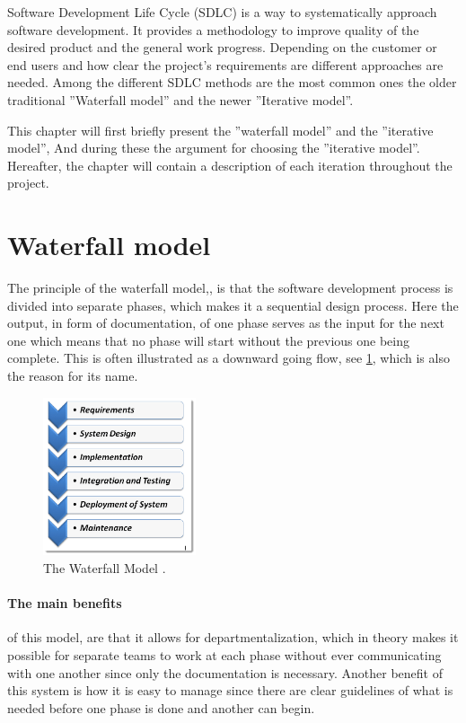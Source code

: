 Software Development Life Cycle (SDLC) is a way to systematically approach software development.
It provides a methodology to improve quality of the desired product and the general work progress. 
Depending on the customer or end users and how clear the project's requirements are different approaches are needed. 
Among the different SDLC methods are the most common ones the older traditional ''Waterfall model'' and the newer ''Iterative model''. \cite{SDLC-Toolsqa}

This chapter will first briefly present the ''waterfall model'' and the ''iterative model'', And during these the argument for choosing the ''iterative model''.
Hereafter, the chapter will contain a description of each iteration throughout the project.


\section{Waterfall model}\label{sec:WaterfallModel}
The principle of the waterfall model,\cite{Waterfall-Toolsqa}, is that the software development process is divided into separate phases, which makes it a sequential design process.
Here the output, in form of documentation, of one phase serves as the input for the next one which means that no phase will start without the previous one being complete.
This is often illustrated as a downward going flow, see \cref{fig:Waterfall}, which is also the reason for its name.

\begin{figure}[H]
	\centering
	\includegraphics[width=0.4\textwidth]{billeder/WaterFall-Model.png}
	\caption{The Waterfall Model \cite{Waterfall-Toolsqa}.}\label{fig:Waterfall}
\end{figure}

\paragraph{The main benefits} of this model, are that it allows for departmentalization, which in theory makes it possible for separate teams to work at each phase without ever communicating with one another since only the documentation is necessary.
Another benefit of this system is how it is easy to manage since there are clear guidelines of what is needed before one phase is done and another can begin.


